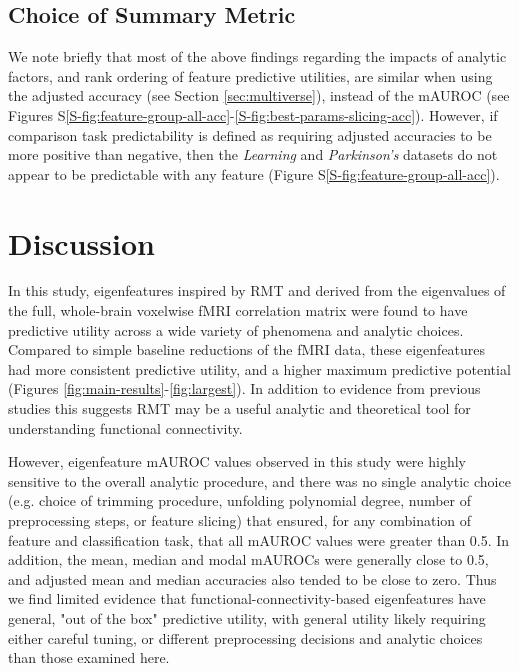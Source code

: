 \documentclass[12pt]{spieman}  %
\begin{document}
\begin{spacing}{2}
\subsection{Choice of Summary Metric}
We note briefly that most of the above findings regarding the impacts of
analytic factors, and rank ordering of feature predictive utilities, are
similar when using the adjusted accuracy (see Section \ref{sec:multiverse}),
instead of the mAUROC (see Figures
S\ref{S-fig:feature-group-all-acc}-\ref{S-fig:best-params-slicing-acc}).
However, if comparison task predictability is defined as requiring adjusted
accuracies to be more positive than negative, then the \textit{Learning} and
\textit{Parkinson's} datasets do not appear to be predictable with any feature
(Figure S\ref{S-fig:feature-group-all-acc}).


\section{Discussion}
\label{sec:discussion}

In this study, eigenfeatures inspired by RMT and derived from the eigenvalues
of the full, whole-brain voxelwise fMRI correlation matrix were found to have
predictive utility across a wide variety of phenomena and analytic choices.
Compared to simple baseline reductions of the fMRI data, these eigenfeatures
had more consistent predictive utility, and a higher maximum predictive
potential (Figures \ref{fig:main-results}-\ref{fig:largest}). In addition to
evidence from previous studies
\cite{sebaRandomMatrixAnalysis2003,wangRandomMatrixTheory2016,matharooSpontaneousBackpainAlters2020}
this suggests RMT may be a useful analytic and theoretical tool for
understanding functional connectivity.

However, eigenfeature mAUROC values observed in this study were highly
sensitive to the overall analytic procedure, and there was no single analytic
choice (e.g. choice of trimming procedure, unfolding polynomial degree, number
of preprocessing steps, or feature slicing) that ensured, for any combination
of feature and classification task, that all mAUROC values were greater than
0.5. In addition, the mean, median and modal mAUROCs were generally close to
0.5, and adjusted mean and median accuracies also tended to be close to zero.
Thus we find limited evidence that functional-connectivity-based eigenfeatures
have general, "out of the box" predictive utility, with general
utility likely requiring either careful tuning, or different preprocessing
decisions and analytic choices than those examined here.




\end{spacing}
\end{document}
